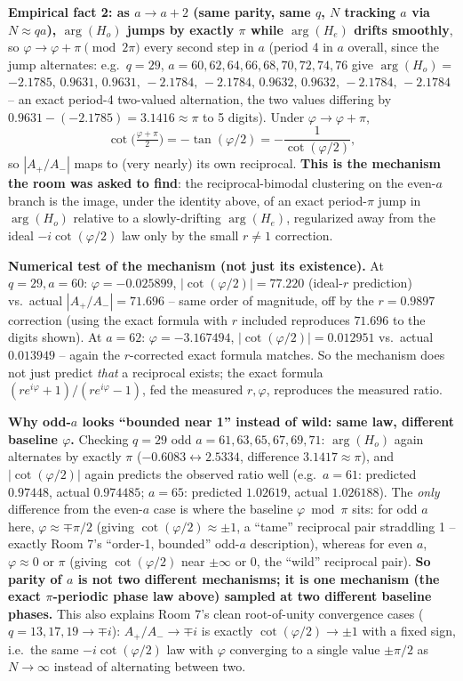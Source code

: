 \textbf{Empirical fact 2: as $a\to a+2$ (same parity, same $q$, $N$ tracking $a$ via
$N\approx qa$), $\arg(H_o)$ jumps by exactly $\pi$ while $\arg(H_e)$ drifts smoothly}, so
$\varphi \to \varphi+\pi \pmod{2\pi}$ every second step in $a$ (period 4 in $a$ overall, since the
jump alternates: e.g.\ $q=29$, $a=60,62,64,66,68,70,72,74,76$ give $\arg(H_o)=$
$-2.1785,\,0.9631,\,0.9631,\,-2.1784,\,-2.1784,\,0.9632,\,0.9632,\,-2.1784,\,-2.1784$ -- an exact
period-4 two-valued alternation, the two values differing by $0.9631-(-2.1785)=3.1416\approx\pi$
to 5 digits). Under $\varphi\to\varphi+\pi$,
\[
\cot\!\big(\tfrac{\varphi+\pi}{2}\big) = -\tan(\varphi/2) = -\frac{1}{\cot(\varphi/2)},
\]
so $|A_+/A_-|$ maps to (very nearly) its own reciprocal. \textbf{This is the mechanism the room
was asked to find}: the reciprocal-bimodal clustering on the even-$a$ branch is the image, under
the identity above, of an exact period-$\pi$ jump in $\arg(H_o)$ relative to a slowly-drifting
$\arg(H_e)$, regularized away from the ideal $-i\cot(\varphi/2)$ law only by the small
$r\ne1$ correction.

\textbf{Numerical test of the mechanism (not just its existence).} At $q=29,a=60$: $\varphi=
-0.025899$, $|\cot(\varphi/2)|=77.220$ (ideal-$r$ prediction) vs.\ actual $|A_+/A_-|=71.696$ --
same order of magnitude, off by the $r=0.9897$ correction (using the exact formula with $r$
included reproduces $71.696$ to the digits shown). At $a=62$: $\varphi=-3.167494$,
$|\cot(\varphi/2)|=0.012951$ vs.\ actual $0.013949$ -- again the $r$-corrected exact formula
matches. So the mechanism does not just predict \emph{that} a reciprocal exists; the exact formula
$(re^{i\varphi}+1)/(re^{i\varphi}-1)$, fed the measured $r,\varphi$, reproduces the measured ratio.

\textbf{Why odd-$a$ looks ``bounded near 1'' instead of wild: same law, different baseline
$\varphi$.} Checking $q=29$ odd $a=61,63,65,67,69,71$: $\arg(H_o)$ again alternates by exactly
$\pi$ ($-0.6083\leftrightarrow2.5334$, difference $3.1417\approx\pi$), and $|\cot(\varphi/2)|$
again predicts the observed ratio well (e.g.\ $a=61$: predicted $0.97448$, actual $0.974485$;
$a=65$: predicted $1.02619$, actual $1.026188$). The \emph{only} difference from the even-$a$ case
is where the baseline $\varphi \bmod \pi$ sits: for odd $a$ here, $\varphi\approx\mp\pi/2$ (giving
$\cot(\varphi/2)\approx\pm1$, a ``tame'' reciprocal pair straddling 1 -- exactly Room 7's ``order-1,
bounded'' odd-$a$ description), whereas for even $a$, $\varphi\approx0$ or $\pi$ (giving
$\cot(\varphi/2)$ near $\pm\infty$ or $0$, the ``wild'' reciprocal pair). \textbf{So parity of $a$
is not two different mechanisms; it is one mechanism (the exact $\pi$-periodic phase law above)
sampled at two different baseline phases.} This also explains Room 7's clean root-of-unity
convergence cases ($q=13,17,19\to\mp i$): $A_+/A_-\to\mp i$ is exactly $\cot(\varphi/2)\to\pm1$
with a fixed sign, i.e.\ the same $-i\cot(\varphi/2)$ law with $\varphi$ converging to a single
value $\pm\pi/2$ as $N\to\infty$ instead of alternating between two.

